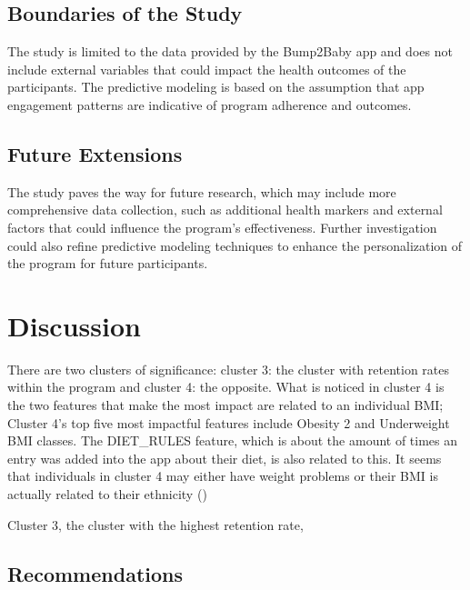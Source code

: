 \documentclass[12pt]{article}
\begin{document}
\label{s.limit}

\subsection{Boundaries of the Study}
The study is limited to the data provided by the Bump2Baby app and does not include external variables that could impact the health outcomes of the participants. The predictive modeling is based on the assumption that app engagement patterns are indicative of program adherence and outcomes.

\subsection{Future Extensions}
The study paves the way for future research, which may include more comprehensive data collection, such as additional health markers and external factors that could influence the program's effectiveness. Further investigation could also refine predictive modeling techniques to enhance the personalization of the program for future participants.


	\section{Discussion}
	
	\label{s.discuss}
	
	There are two clusters of significance: cluster 3: the cluster with retention rates within the program and cluster 4: the opposite. What is noticed in cluster 4 is the two features that make the most impact are related to an individual BMI; Cluster 4's top five most impactful features include Obesity 2 and Underweight BMI classes. The DIET\_RULES feature, which is about the amount of times an entry was added into the app about their diet, is also related to this. It seems that individuals in cluster 4 may either have weight problems or their BMI is actually related to their ethnicity (\cite{kirbyj1})
	
	Cluster 3, the cluster with the highest retention rate, 
	
	\subsection{Recommendations}
	


\newpage
%
%

\setlength{\bibhang}{0pt}

\raggedright

\end{document}
